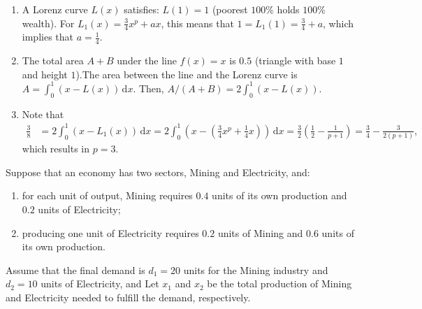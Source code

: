 \documentclass[11pt]{exam}
\begin{document}
\begin{questions}
    
    
\begin{solution}[0cm]
    \begin{enumerate}[leftmargin = 0.5cm, label = (\alph*), rightmargin = 0.2cm]
        
        \item A Lorenz curve $L(x)$ satisfies: $L(1) = 1$ (poorest $100\%$ holds $100\%$ wealth). For $L_1(x) = \frac{3}{4}x^p + ax$, this means that $1 = L_1(1) = \frac{3}{4} + a$, which implies that $a = \frac{1}{4}$.

        \item The total area $A+B$ under the line $f(x)=x$ is $0.5$ (triangle with base $1$ and height $1$).The area between the line and the Lorenz curve is $A = \int_0^1(x - L(x))\,\mathrm{d} x$. Then, $A/(A+B) = 2 \int_0^1 (x - L(x))$.

        \item Note that
        \begin{align*}
            \frac{3}{8} &= 2 \int_0^1 (x - L_1(x)) \, \mathrm{d}x = 2 \int_0^1 \left(x - \left(\frac{3}{4}x^p + \frac{1}{4}x\right)\right) \, \mathrm{d}x = \frac{3}{2} \left(\frac{1}{2} - \frac{1}{p+1}\right) = \frac{3}{4} - \frac{3}{2(p+1)},
        \end{align*}
        which results in $p = 3$.


        
    \end{enumerate}
\end{solution}

\question[3]
     Suppose that an economy has two sectors, Mining and Electricity, and:
     \begin{enumerate}[leftmargin = 0.5cm, label = (\textit{\roman*}), rightmargin = 0.2cm]
        \item for each unit of output, Mining requires $0.4$ units of its own production and $0.2$ units of Electricity;
        \item producing one unit of Electricity requires $0.2$ units of Mining and $0.6$ units of its own production.
     \end{enumerate}
        Assume that the final demand is $d_1 =20$ units for the Mining industry and $d_2 = 10$ units of Electricity, and Let $x_1$ and $x_2$ be the total production of Mining and Electricity needed to fulfill the demand, respectively.


\end{questions}
\end{document}

